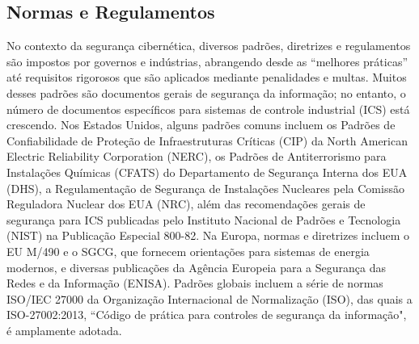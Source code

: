 


\subsection{Normas e Regulamentos}

No contexto da segurança cibernética, diversos padrões, diretrizes e regulamentos são impostos por governos e indústrias, abrangendo desde as ``melhores práticas'' até requisitos rigorosos que são aplicados mediante penalidades e multas. Muitos desses padrões são documentos gerais de segurança da informação; no entanto, o número de documentos específicos para sistemas de controle industrial (ICS) está crescendo. Nos Estados Unidos, alguns padrões comuns incluem os Padrões de Confiabilidade de Proteção de Infraestruturas Críticas (CIP) da North American Electric Reliability Corporation (NERC), os Padrões de Antiterrorismo para Instalações Químicas (CFATS) do Departamento de Segurança Interna dos EUA (DHS), a Regulamentação de Segurança de Instalações Nucleares pela Comissão Reguladora Nuclear dos EUA (NRC), além das recomendações gerais de segurança para ICS publicadas pelo Instituto Nacional de Padrões e Tecnologia (NIST) na Publicação Especial 800-82. Na Europa, normas e diretrizes incluem o EU M/490 e o SGCG, que fornecem orientações para sistemas de energia modernos, e diversas publicações da Agência Europeia para a Segurança das Redes e da Informação (ENISA). Padrões globais incluem a série de normas ISO/IEC 27000 da Organização Internacional de Normalização (ISO), das quais a ISO-27002:2013, ``Código de prática para controles de segurança da informação", é amplamente adotada.


